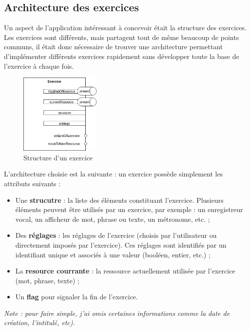\subsection{Architecture des exercices}

Un aspect de l'application intéressant à concevoir était la structure des exercices. Les exercices sont différents, mais partagent tout de même beaucoup de points communs, il était donc nécessaire de trouver une architecture permettant d'implémenter différents exercices rapidement sans développer toute la base de l'exercice à chaque fois.

\begin{figure}[H]
  \includegraphics[width=150px]{content/imgs/exercice.png}
  \caption{Structure d'un exercice}
  \label{fig:exercice}
\end{figure}

L'architecture choisie est la suivante : un exercice possède simplement les attributs suivants :

\begin{itemize}
  \item Une \textbf{strucutre} : la liste des éléments constituant l'exercice. Plusieurs éléments peuvent être utilisés par un exercice, par exemple : un enregistreur vocal, un afficheur de mot, phrase ou texte, un métronome, etc. ;
  \item Des \textbf{réglages} : les réglages de l'exercice (choisis par l'utilisateur ou directement imposés par l'exercice). Ces réglages sont identifiés par un identifiant unique et associés à une valeur (booléen, entier, etc.) ;
  \item La \textbf{resource courrante} : la ressource actuellement utilisée par l'exercice (mot, phrase, texte) ;
  \item Un \textbf{flag} pour signaler la fin de l'exercice.
\end{itemize}

\textit{Note : pour faire simple, j'ai omis certaines informations comme la date de création, l'intitulé, etc).}

